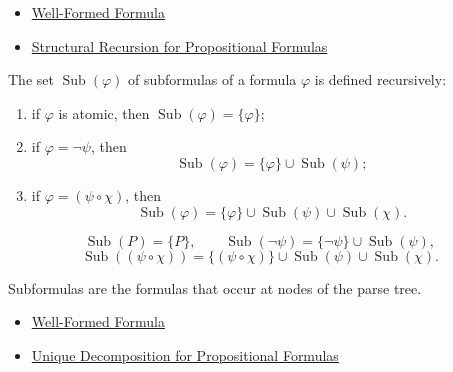 \begin{dependencies}
\begin{itemize}
  \item \hyperref[def:well-formed-formula]{Well-Formed Formula}
  \item \hyperref[thm:structural-recursion-propositional-formulas]{Structural Recursion for Propositional Formulas}
\end{itemize}
\end{dependencies}
\begin{tcolorbox}[colback=propbox, colframe=propborder, arc=2pt,
  left=6pt, right=6pt, top=4pt, bottom=4pt,
  title={\small\textbf{Definition (Subformula)}},
  fonttitle=\small\bfseries]
\begin{definition}[Subformula]
\label{def:subformula-propositional-logic}
The set \(\operatorname{Sub}(\varphi)\) of subformulas of a formula \(\varphi\) is defined recursively:
\begin{enumerate}
\item if \(\varphi\) is atomic, then \(\operatorname{Sub}(\varphi)=\{\varphi\}\);
\item if \(\varphi=\neg\psi\), then
\[
\operatorname{Sub}(\varphi)=\{\varphi\}\cup\operatorname{Sub}(\psi);
\]
\item if \(\varphi=(\psi\circ\chi)\), then
\[
\operatorname{Sub}(\varphi)=\{\varphi\}\cup\operatorname{Sub}(\psi)\cup\operatorname{Sub}(\chi).
\]
\end{enumerate}
\end{definition}
\end{tcolorbox}

\begin{remark*}
\[
\operatorname{Sub}(P)=\{P\},\qquad
\operatorname{Sub}(\neg\psi)=\{\neg\psi\}\cup\operatorname{Sub}(\psi),
\]
\[
\operatorname{Sub}((\psi\circ\chi))
=
\{(\psi\circ\chi)\}\cup\operatorname{Sub}(\psi)\cup\operatorname{Sub}(\chi).
\]
\end{remark*}

\begin{remark*}[Interpretation]
Subformulas are the formulas that occur at nodes of the parse tree.
\end{remark*}

\begin{dependencies}
\begin{itemize}
  \item \hyperref[def:well-formed-formula]{Well-Formed Formula}
  \item \hyperref[thm:unique-decomposition-propositional-formulas]{Unique Decomposition for Propositional Formulas}
\end{itemize}
\end{dependencies}

